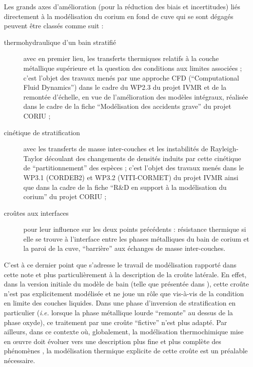 Les grands axes d'amélioration (pour la réduction des biais et incertitudes) liés directement à la modélisation du corium en fond de cuve qui se sont dégagés peuvent être classés comme suit \cite{LeTellier2014,Fichot2018} :
\begin{description}
 \item[thermohydraulique d'un bain stratifié] avec en premier lieu, les transferts thermiques relatifs à la couche métallique supérieure et la question des conditions aux limites associées ; c'est l'objet des travaux menés par une approche CFD (``Computational Fluid Dynamics'') dans le cadre du WP2.3 du projet IVMR et de la remontée d'échelle, en vue de l'amélioration des modèles intégraux, réalisée dans le cadre de la fiche ``Modélisation des accidents grave'' du projet CORIU ; 
 \item[cinétique de stratification] avec les transferts de masse inter-couches et les instabilités de Rayleigh-Taylor découlant des changements de densités induits par cette cinétique de ``partitionnement'' des espèces ; c'est l'objet des travaux menés dans le WP3.1 (CORDEB2) et WP3.2 (VITI-CORMET) du projet IVMR ainsi que dans la cadre de la fiche ``R\&D en support à la modélisation du corium'' du projet CORIU ;
 \item[croûtes aux interfaces] pour leur influence sur les deux points précédents : résistance thermique si elle se trouve à l'interface entre les phases métalliques du bain de corium et la paroi de la cuve, ``barrière'' aux échanges de masse inter-couches.
\end{description}
C'est à ce dernier point que s'adresse le travail de modélisation rapporté dans cette note et plus particulièrement à la description de la croûte latérale. En effet, dans la version initiale du modèle de bain (telle que présentée dans \cite{LeTellier2014}), cette croûte n'est pas explicitement modélisée et ne joue un rôle que vis-à-vis de la condition en limite des couches liquides. Dans une phase d'inversion de stratification en particulier (\textit{i.e.} lorsque la phase métallique lourde ``remonte'' au dessus de la phase oxyde), ce traitement par une croûte ``fictive'' n'est plus adapté. Par ailleurs, dans ce contexte où, globalement, la modélisation thermochimique mise en \oe{}uvre doit évoluer vers une description plus fine et plus complète des phénomènes \cite{Fichot2015}, la modélisation thermique explicite de cette croûte est un préalable nécessaire. 

